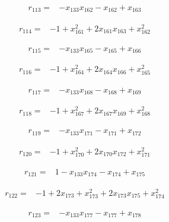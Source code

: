 \begin{align*}
r_{113}={}&-x_{133}x_{162}-x_{162}+x_{163}
\end{align*}

\begin{align*}
r_{114}={}&-1+x_{161}^{2}+2x_{161}x_{163}+x_{162}^{2}
\end{align*}

\begin{align*}
r_{115}={}&-x_{133}x_{165}-x_{165}+x_{166}
\end{align*}

\begin{align*}
r_{116}={}&-1+x_{164}^{2}+2x_{164}x_{166}+x_{165}^{2}
\end{align*}

\begin{align*}
r_{117}={}&-x_{133}x_{168}-x_{168}+x_{169}
\end{align*}

\begin{align*}
r_{118}={}&-1+x_{167}^{2}+2x_{167}x_{169}+x_{168}^{2}
\end{align*}

\begin{align*}
r_{119}={}&-x_{133}x_{171}-x_{171}+x_{172}
\end{align*}

\begin{align*}
r_{120}={}&-1+x_{170}^{2}+2x_{170}x_{172}+x_{171}^{2}
\end{align*}

\begin{align*}
r_{121}={}&1-x_{133}x_{174}-x_{174}+x_{175}
\end{align*}

\begin{align*}
r_{122}={}&-1+2x_{173}+x_{173}^{2}+2x_{173}x_{175}+x_{174}^{2}
\end{align*}

\begin{align*}
r_{123}={}&-x_{133}x_{177}-x_{177}+x_{178}
\end{align*}

